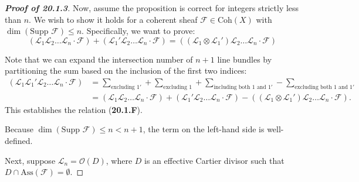 \begin{proof}[\textbf{Proof of 20.1.3}]
Now, assume the proposition is correct for integers strictly less than $n$. We wish to show it holds for a coherent sheaf $\mathcal{F} \in \text{Coh}(X)$ with $\dim(\text{Supp } \mathcal{F}) \leq n$. Specifically, we want to prove:
\begin{equation}\label{multilinearity}
    (\mathcal{L}_1 \mathcal{L}_2 \dots \mathcal{L}_n \cdot \mathcal{F}) + (\mathcal{L}_1' \mathcal{L}_2 \dots \mathcal{L}_n \cdot \mathcal{F}) = ((\mathcal{L}_1 \otimes \mathcal{L}_1') \mathcal{L}_2 \dots \mathcal{L}_n \cdot \mathcal{F})
\end{equation}


Note that we can expand the intersection number of $n+1$ line bundles by partitioning the sum based on the inclusion of the first two indices:
\begin{align*}
(\mathcal{L}_1 \mathcal{L}_1' \mathcal{L}_2 \dots \mathcal{L}_n \cdot \mathcal{F})
 &= \sum_{\text{excluding } 1'} + \sum_{\text{excluding } 1} + \sum_{\text{including both } 1 \text{ and } 1'} - \sum_{\text{excluding both } 1 \text{ and }  1'} \\
&= (\mathcal{L}_1 \mathcal{L}_2 \dots \mathcal{L}_n \cdot \mathcal{F}) + (\mathcal{L}_1' \mathcal{L}_2 \dots \mathcal{L}_n \cdot \mathcal{F}) - ((\mathcal{L}_1 \otimes \mathcal{L}_1') \mathcal{L}_2 \dots \mathcal{L}_n \cdot \mathcal{F}).
\end{align*}
This establishes the relation (\textbf{20.1.F}).

\begin{remark}
Because $\dim(\text{Supp } \mathcal{F}) \leq n < n+1$, the term on the left-hand side is well-defined.
\end{remark}

Next, suppose $\mathcal{L}_n = \mathcal{O}(D)$, where $D$ is an effective Cartier divisor such that $D \cap \text{Ass}(\mathcal{F}) = \emptyset$.


\end{proof}
